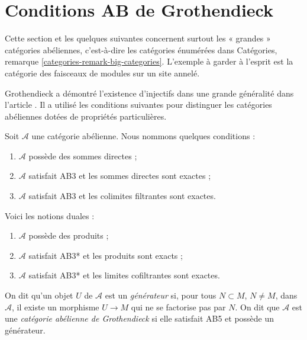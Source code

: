 \section{Conditions AB de Grothendieck}
\label{section-grothendieck-conditions}

\noindent
Cette section et les quelques suivantes concernent surtout les « grandes »
catégories abéliennes, c'est-à-dire les catégories énumérées dans
Catégories, remarque \ref{categories-remark-big-categories}. L'exemple à
garder à l'esprit est la catégorie des faisceaux de modules sur un site annelé.

\medskip\noindent
Grothendieck a démontré l'existence d'injectifs dans une grande généralité dans
l'article \cite{Tohoku}. Il a utilisé les conditions suivantes pour distinguer
les catégories abéliennes dotées de propriétés particulières.

\begin{definition}
\label{definition-grothendieck-conditions}
Soit $\mathcal{A}$ une catégorie abélienne. Nous nommons quelques conditions :
\begin{enumerate}
\item[AB3] $\mathcal{A}$ possède des sommes directes ;
\item[AB4] $\mathcal{A}$ satisfait AB3 et les sommes directes sont exactes ;
\item[AB5] $\mathcal{A}$ satisfait AB3 et les colimites filtrantes sont
exactes.
\end{enumerate}
Voici les notions duales :
\begin{enumerate}
\item[AB3*] $\mathcal{A}$ possède des produits ;
\item[AB4*] $\mathcal{A}$ satisfait AB3* et les produits sont exacts ;
\item[AB5*] $\mathcal{A}$ satisfait AB3* et les limites cofiltrantes sont
exactes.
\end{enumerate}
On dit qu'un objet $U$ de $\mathcal{A}$ est un {\it générateur} si, pour tous
$N \subset M$, $N \not = M$, dans $\mathcal{A}$, il existe un morphisme
$U \to M$ qui ne se factorise pas par $N$. On dit que $\mathcal{A}$ est une
{\it catégorie abélienne de Grothendieck} si elle satisfait AB5 et possède un
générateur.
\end{definition}

